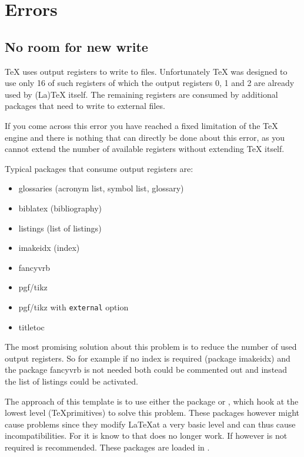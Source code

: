 \section{Errors}

\subsection{No room for new write}
\label{sec:problems:write}

TeX uses output registers to write to files. Unfortunately TeX was designed to use only 16 of such registers of which the output registers 0, 1 and 2 are already used by (La)TeX itself. The remaining registers are consumed by additional packages that need to write to external files.

If you come across this error you have reached a fixed limitation of the TeX engine and there is nothing that can directly be done about this error, as you cannot extend the number of available registers without extending TeX itself.

Typical packages that consume output registers are:
\begin{itemize}
\item glossaries (acronym list, symbol list, glossary)
\item biblatex (bibliography)
\item listings (list of listings)
\item imakeidx (index)
\item fancyvrb 
\item pgf/tikz
\item pgf/tikz with \texttt{external} option
\item titletoc
\end{itemize}

The most promising solution about this problem is to reduce the number of used output registers. So for example if no index is required (package imakeidx) and the package fancyvrb is not needed both could be commented out and instead the list of listings could be activated.

The approach of this template is to use either the package  or , which hook at the lowest level (\TeX primitives) to solve this problem. These packages however might cause problems since they modify \LaTeX at a very basic level and can thus cause incompatibilities. For  it is know to that  does no longer work. If however  is not required  is recommended.
These packages are loaded in .

